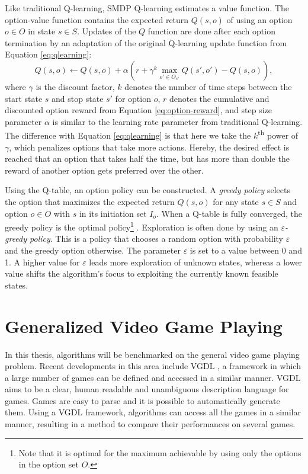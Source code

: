 Like traditional Q-learning, SMDP Q-learning estimates a value function. The
option-value function contains the expected return $Q(s, o)$ of using an option
$o \in O$ in state $s \in S$. Updates of the $Q$ function are done after each
option termination by an adaptation of the original Q-learning update function
from Equation \ref{eq:qlearning}:
\begin{equation}
	\label{eq:smdp-qlearning}
	Q(s, o) \gets Q(s, o) + \alpha \left(r + \gamma^k \max_{o' \in O_{s'}}Q(s',
	o') - Q(s, o)\right),
\end{equation}
where $\gamma$ is the discount factor, $k$ denotes the number of time steps
between the start state $s$ and stop state $s'$ for option $o$, $r$ denotes
the cumulative and discounted option reward from Equation
\ref{eq:option-reward}, and step size parameter $\alpha$ is similar to the
learning rate parameter from traditional Q-learning.  The difference with
Equation \ref{eq:qlearning} is that here we take the $k$\textsuperscript{th}
power of $\gamma$, which penalizes options that take more actions. Hereby, the
desired effect is reached that an option that takes half the time, but has more
than double the reward of another option gets preferred over the other.

Using the Q-table, an option policy can be constructed. A \emph{greedy policy}
selects the option that maximizes the expected return $Q(s, o)$ for any state
$s \in S$ and option $o \in O$ with $s$ in its initiation set $I_o$. When a Q-table
is fully converged, the greedy policy is the optimal policy\footnote{Note that
it is optimal for the maximum achievable by using only the options in the option
set $O$.} \cite{sutton1999between}. Exploration is often done by using an
\emph{$\varepsilon$-greedy policy}. This is a policy that chooses a random option
with probability $\varepsilon$ and the greedy option otherwise. The parameter
$\varepsilon$ is set to a value between 0 and 1. A higher value for $\varepsilon$
leads more exploration of unknown states, whereas a lower value shifts the
algorithm's focus to exploiting the currently known feasible states.

\section{Generalized Video Game Playing}
\label{subsec:vgdl}

In this thesis, algorithms will be benchmarked on the general video game playing
problem. Recent developments in this area include VGDL \cite{schaul2013video}, a
framework in which a large number of games can be defined and accessed in a
similar manner.  VGDL aims to be a clear, human readable and unambiguous
description language for games. Games are easy to parse and it is possible to
automatically generate them. Using a VGDL framework, algorithms can access all
the games in a similar manner, resulting in a method to compare their
performances on several games.

